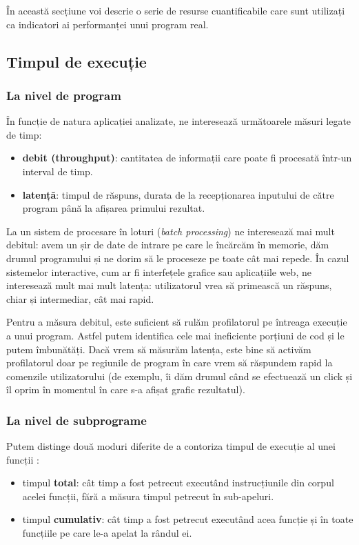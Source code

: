 În această secțiune voi descrie o serie de resurse cuantificabile care sunt utilizați ca indicatori ai performanței unui program real.

\subsection{Timpul de execuție}

\subsubsection{La nivel de program}

În funcție de natura aplicației analizate, ne interesează următoarele măsuri legate de timp:

\begin{itemize}
    \item \textbf{debit (throughput)}: cantitatea de informații care poate fi procesată într-un interval de timp.
    \item \textbf{latență}: timpul de răspuns, durata de la recepționarea inputului de către program până la afișarea primului rezultat.
\end{itemize}

La un sistem de procesare în loturi (\textit{batch processing}) ne interesează mai mult debitul: avem un șir de date de intrare pe care le încărcăm în memorie, dăm drumul programului și ne dorim să le proceseze pe toate cât mai repede. În cazul sistemelor interactive, cum ar fi interfețele grafice sau aplicațiile web, ne interesează mult mai mult latența: utilizatorul vrea să primească un răspuns, chiar și intermediar, cât mai rapid.

Pentru a măsura debitul, este suficient să rulăm profilatorul pe întreaga execuție a unui program. Astfel putem identifica cele mai ineficiente porțiuni de cod și le putem îmbunătăți. Dacă vrem să măsurăm latența, este bine să activăm profilatorul doar pe regiunile de program în care vrem să răspundem rapid la comenzile utilizatorului (de exemplu, îi dăm drumul când se efectuează un click și îl oprim în momentul în care s-a afișat grafic rezultatul).

\subsubsection{La nivel de subprograme}
\label{sec:total_time}

Putem distinge două moduri diferite de a contoriza timpul de execuție al unei funcții \cite{cprofile_user_manual}:
\begin{itemize}
    \item timpul \textbf{total}: cât timp a fost petrecut executând instrucțiunile din corpul acelei funcții, fără a măsura timpul petrecut în sub-apeluri.
    \item timpul \textbf{cumulativ}: cât timp a fost petrecut executând acea funcție și în toate funcțiile pe care le-a apelat la rândul ei.
\end{itemize}

